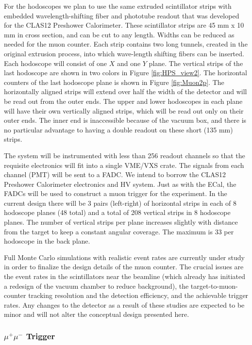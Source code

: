 For the hodoscopes we plan to use the same extruded scintillator strips with embedded wavelength-shifting fiber and phototube readout that was 
developed for the CLAS12 Preshower Calorimeter. These scintillator strips are 45 mm x 10 mm in cross section, and can be cut to any length. 
Widths can be reduced as needed for the muon counter. Each strip contains two long tunnels, created in the original extrusion process, into 
which wave-length shifting fibers can be inserted.  Each hodoscope will consist of one $X$ and one $Y$ plane.  The vertical strips of the last 
hodoscope are shown in two colors in Figure \ref{fig:HPS_view2}. The horizontal counters of the last 
hodoscope plane is shown in
Figure \ref{fig:Muon2p}. The horizontally aligned strips will extend over half the width of the detector and will be read out from the outer ends.  
The upper and lower hodoscopes in each plane will have their own vertically aligned strips, which will be read out only on their outer ends.  
The inner end is inaccessible because of the vacuum box, and there is no particular advantage to having a double readout on these short 
(135 mm) strips.  

The system will be instrumented with less than 256 readout channels so that the requisite electronics will 
fit into a single VME/VXS crate.  The signals from each channel (PMT) 
will be sent to a FADC.  We intend to borrow the CLAS12 Preshower Calorimeter electronics and HV system.  Just as with the ECal, the FADCs will be 
used to construct a muon trigger for the experiment.  In the current design there will be 3 pairs (left-right) of horizontal strips in 
each of 8 hodoscope planes (48 total) and a total of 208 vertical strips in 8 hodoscope planes.  The number of vertical strips per plane 
increases slightly with distance from the target to keep a constant angular coverage.  The maximum is 33 per hodoscope in the back plane.

Full Monte Carlo simulations with realistic event rates are currently under study in order to finalize the design details of the muon counter.  
The crucial issues are the event rates in the scintillators near the beamline (which already has initiated a redesign of the vacuum chamber 
to reduce background), the target-to-muon-counter tracking resolution and the detection efficiency, and the achievable trigger rates.  
Any changes to the detector as a result of these studies are expected to be minor and will not alter the conceptual design presented here.

\subsubsection{ $\mu^+\mu^-$ Trigger} 

